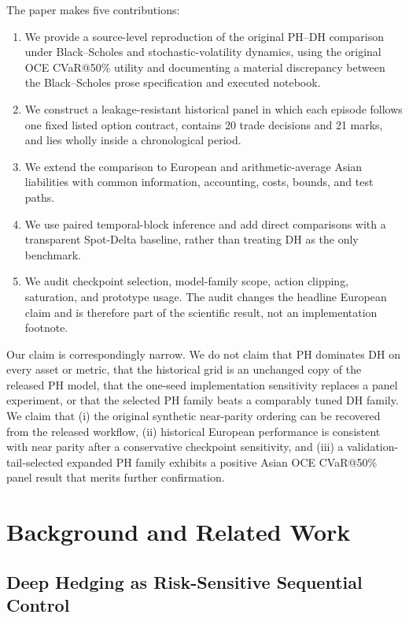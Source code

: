 \documentclass[conference]{IEEEtran}
\begin{document}
The paper makes five contributions:
\begin{enumerate}
    \item We provide a source-level reproduction of the original PH--DH
    comparison under Black--Scholes and stochastic-volatility dynamics, using
    the original OCE CVaR@50\% utility and documenting a material discrepancy
    between the Black--Scholes prose specification and executed notebook.
    \item We construct a leakage-resistant historical panel in which each
    episode follows one fixed listed option contract, contains 20 trade
    decisions and 21 marks, and lies wholly inside a chronological period.
    \item We extend the comparison to European and arithmetic-average Asian
    liabilities with common information, accounting, costs, bounds, and test
    paths.
    \item We use paired temporal-block inference and add direct comparisons
    with a transparent Spot-Delta baseline, rather than treating DH as the only
    benchmark.
    \item We audit checkpoint selection, model-family scope, action clipping,
    saturation, and prototype usage. The audit changes the headline European
    claim and is therefore part of the scientific result, not an implementation
    footnote.
\end{enumerate}

Our claim is correspondingly narrow. We do not claim that PH dominates DH on
every asset or metric, that the historical grid is an unchanged copy of the
released PH model, that the one-seed implementation sensitivity replaces a
panel experiment, or that the selected PH family beats a comparably tuned DH
family. We claim that (i) the original synthetic near-parity ordering can be
recovered from the released workflow, (ii) historical European performance is
consistent with near parity after a conservative checkpoint sensitivity, and
(iii) a validation-tail-selected expanded PH family exhibits a positive Asian
OCE CVaR@50\% panel result that merits further confirmation.

\section{Background and Related Work}

\subsection{Deep Hedging as Risk-Sensitive Sequential Control}
\end{document}
